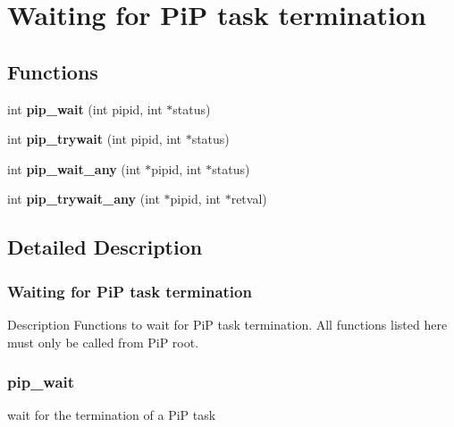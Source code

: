 \hypertarget{group__pip-3-wait}{\section{Waiting for Pi\-P task termination}
\label{group__pip-3-wait}
}
\subsection*{Functions}
\begin{DoxyCompactItemize}
\item 
\hypertarget{group__pip-3-wait_gae04520bc29d3ec85d7090f7e645de27d}{int {\bfseries pip\-\_\-wait} (int pipid, int $\ast$status)}\label{group__pip-3-wait_gae04520bc29d3ec85d7090f7e645de27d}

\item 
\hypertarget{group__pip-3-wait_ga9e786d15401af041842f3f503c962a4b}{int {\bfseries pip\-\_\-trywait} (int pipid, int $\ast$status)}\label{group__pip-3-wait_ga9e786d15401af041842f3f503c962a4b}

\item 
\hypertarget{group__pip-3-wait_ga621bba73fda6b2bbe3c04e0c65006d36}{int {\bfseries pip\-\_\-wait\-\_\-any} (int $\ast$pipid, int $\ast$status)}\label{group__pip-3-wait_ga621bba73fda6b2bbe3c04e0c65006d36}

\item 
\hypertarget{group__pip-3-wait_ga65731447fedb85cbe4d5c38093383a20}{int {\bfseries pip\-\_\-trywait\-\_\-any} (int $\ast$pipid, int $\ast$retval)}\label{group__pip-3-wait_ga65731447fedb85cbe4d5c38093383a20}

\end{DoxyCompactItemize}


\subsection{Detailed Description}
\hypertarget{pip-wait}{}\subsubsection{Waiting for Pi\-P task termination}\label{pip-wait}
\begin{DoxyParagraph}{Description}
Functions to wait for Pi\-P task termination. All functions listed here must only be called from Pi\-P root. 
\end{DoxyParagraph}
\hypertarget{pip_wait}{}\subsubsection{pip\-\_\-wait}\label{pip_wait}
wait for the termination of a Pi\-P task

